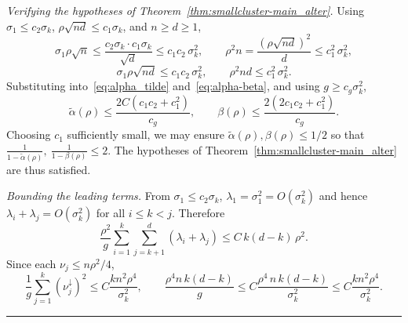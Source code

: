 \documentclass{article}
\newcommand{\BlackBox}{\rule{1.5ex}{1.5ex}}  %
\newenvironment{proof}{\par\noindent{\bf Proof\ }}{\hfill\BlackBox\par\medskip}
\begin{document}
\begin{proof}

\emph{Verifying the hypotheses of Theorem~\ref{thm:smallcluster-main_alter}.} Using $\sigma_1 \le c_2\sigma_k$, $\rho\sqrt{nd} \le c_1\sigma_k$, and $n \ge d \ge 1$,
\begin{equation*}
    \sigma_1\rho\sqrt n \le \frac{c_2\sigma_k\cdot c_1\sigma_k}{\sqrt d} \le c_1 c_2\,\sigma_k^2,\qquad
    \rho^2 n = \frac{(\rho\sqrt{nd})^2}{d} \le c_1^2\,\sigma_k^2,
\end{equation*}
\begin{equation*}
    \sigma_1\rho\sqrt{nd} \le c_1 c_2\,\sigma_k^2,\qquad
    \rho^2 nd \le c_1^2\,\sigma_k^2.
\end{equation*}
Substituting into~\eqref{eq:alpha_tilde} and~\eqref{eq:alpha-beta}, and using $g \ge c_g\sigma_k^2$,
\begin{equation*}
    \tilde\alpha(\rho) \le \frac{2C(c_1 c_2 + c_1^2)}{c_g},\qquad
    \beta(\rho) \le \frac{2(2 c_1 c_2 + c_1^2)}{c_g}.
\end{equation*}
Choosing $c_1$ sufficiently small, we may ensure $\tilde\alpha(\rho), \beta(\rho) \le 1/2$ so that $\tfrac{1}{1-\tilde\alpha(\rho)},\ \tfrac{1}{1-\beta(\rho)} \le 2$. The hypotheses of Theorem~\ref{thm:smallcluster-main_alter} are thus satisfied.

\emph{Bounding the leading terms.} From $\sigma_1 \le c_2\sigma_k$, $\lambda_1 = \sigma_1^2 = O(\sigma_k^2)$ and hence $\lambda_i + \lambda_j = O(\sigma_k^2)$ for all $i \le k < j$. Therefore
\begin{equation*}
    \frac{\rho^2}{g}\sum_{i=1}^{k}\sum_{j=k+1}^{d}(\lambda_i+\lambda_j) \le C\,k(d-k)\,\rho^2.
\end{equation*}
Since each $\nu_j \le n\rho^2/4$,
\begin{equation*}
    \frac{1}{g}\sum_{j=1}^{k}(\nu_j^\downarrow)^2 \le C\frac{kn^2\rho^4}{\sigma_k^2}, \qquad \frac{\rho^4 n\,k(d-k)}{g} \le C\frac{\rho^4\,n\,k(d-k)}{\sigma_k^2} \le C\frac{kn^2\rho^4}{\sigma_k^2}.
\end{equation*}


\end{proof}
\end{document}
